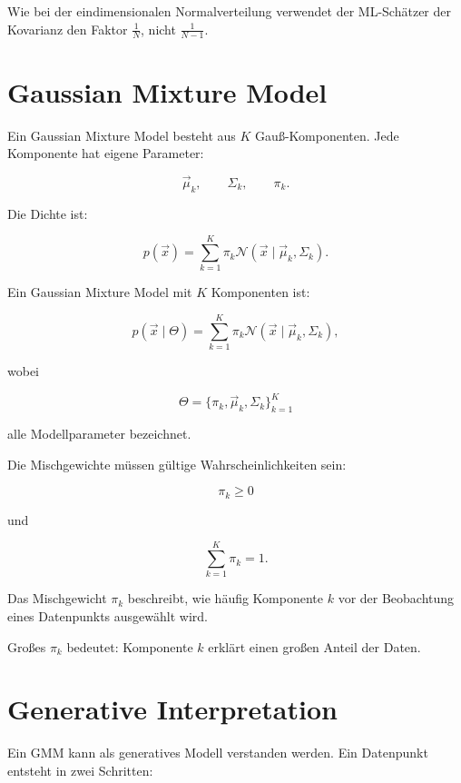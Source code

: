 \begin{notebox}
Wie bei der eindimensionalen Normalverteilung verwendet der ML-Schätzer der Kovarianz den Faktor \(\frac{1}{N}\), nicht \(\frac{1}{N-1}\).
\end{notebox}

\section{Gaussian Mixture Model}

Ein Gaussian Mixture Model besteht aus \(K\) Gauß-Komponenten.
Jede Komponente hat eigene Parameter:

\[
    \vec{\mu}_k,
    \qquad
    \Sigma_k,
    \qquad
    \pi_k.
\]

Die Dichte ist:

\[
    p(\vec{x})
    =
    \sum_{k=1}^{K}
    \pi_k
    \mathcal{N}(\vec{x}\mid\vec{\mu}_k,\Sigma_k).
\]

\begin{definitionbox}
Ein Gaussian Mixture Model mit \(K\) Komponenten ist:

\[
    p(\vec{x}\mid\Theta)
    =
    \sum_{k=1}^{K}
    \pi_k
    \mathcal{N}(\vec{x}\mid\vec{\mu}_k,\Sigma_k),
\]

wobei

\[
    \Theta
    =
    \{\pi_k,\vec{\mu}_k,\Sigma_k\}_{k=1}^{K}
\]

alle Modellparameter bezeichnet.
\end{definitionbox}

Die Mischgewichte müssen gültige Wahrscheinlichkeiten sein:

\[
    \pi_k\geq 0
\]

und

\[
    \sum_{k=1}^{K}
    \pi_k=1.
\]

\begin{conceptbox}
Das Mischgewicht \(\pi_k\) beschreibt, wie häufig Komponente \(k\) vor der Beobachtung eines Datenpunkts ausgewählt wird.

Großes \(\pi_k\) bedeutet:
Komponente \(k\) erklärt einen großen Anteil der Daten.
\end{conceptbox}

\section{Generative Interpretation}

Ein GMM kann als generatives Modell verstanden werden.
Ein Datenpunkt entsteht in zwei Schritten:

